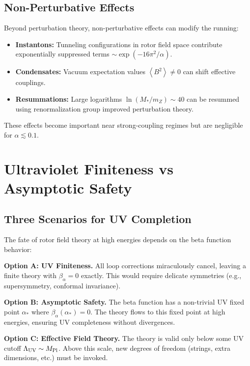 \documentclass[11pt,a4paper]{article}
\numberwithin{equation}{section}
\theoremstyle{plain}
\theoremstyle{definition}
\theoremstyle{remark}
\newcommand{\avg}[1]{\left\langle #1 \right\rangle}
\begin{document}
\subsection{Non-Perturbative Effects}

Beyond perturbation theory, non-perturbative effects can modify the running:
\begin{itemize}
  \item \textbf{Instantons:} Tunneling configurations in rotor field space contribute exponentially suppressed terms $\sim \exp(-16\pi^2/\alpha)$.
  \item \textbf{Condensates:} Vacuum expectation values $\avg{B^2}\neq 0$ can shift effective couplings.
  \item \textbf{Resummations:} Large logarithms $\ln(M_*/m_Z)\sim 40$ can be resummed using renormalization group improved perturbation theory.
\end{itemize}

These effects become important near strong-coupling regimes but are negligible for $\alpha\lesssim 0.1$.

\vspace{1em}

\section{Ultraviolet Finiteness vs Asymptotic Safety}\label{sec:UV}

\subsection{Three Scenarios for UV Completion}

The fate of rotor field theory at high energies depends on the beta function behavior:

\textbf{Option A: UV Finiteness.} All loop corrections miraculously cancel, leaving a finite theory with $\beta_\alpha=0$ exactly. This would require delicate symmetries (e.g., supersymmetry, conformal invariance).

\textbf{Option B: Asymptotic Safety.} The beta function has a non-trivial UV fixed point $\alpha_*$ where $\beta_\alpha(\alpha_*)=0$. The theory flows to this fixed point at high energies, ensuring UV completeness without divergences.

\textbf{Option C: Effective Field Theory.} The theory is valid only below some UV cutoff $\Lambda_{\rm UV} \sim M_{\rm Pl}$. Above this scale, new degrees of freedom (strings, extra dimensions, etc.) must be invoked.
\end{document}
